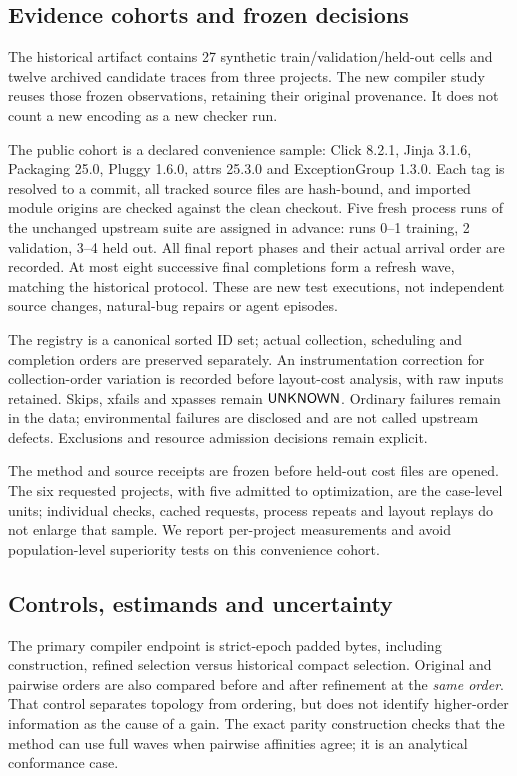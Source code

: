 \documentclass[preprint,12pt]{elsarticle}
\theoremstyle{definition}\newtheorem{definition}[theorem]{Definition}
\begin{document}
\subsection{Evidence cohorts and frozen decisions}
The historical artifact contains 27 synthetic train/validation/held-out
cells and twelve archived candidate traces from three projects.
The new compiler study reuses those frozen observations, retaining their
original provenance. It does not count a new encoding as a new checker run.

The public cohort is a declared convenience sample: Click 8.2.1,
Jinja 3.1.6, Packaging 25.0, Pluggy 1.6.0, attrs 25.3.0 and
ExceptionGroup 1.3.0. Each tag is resolved to a commit, all tracked source
files are hash-bound, and imported module origins are checked against the
clean checkout. Five fresh process runs of the unchanged upstream suite
are assigned in advance: runs 0--1 training, 2 validation, 3--4 held out.
All final report phases and their actual arrival order are recorded.
At most eight successive final completions form a refresh wave, matching
the historical protocol. These are new test executions, not independent
source changes, natural-bug repairs or agent episodes.

The registry is a canonical sorted ID set; actual collection, scheduling and
completion orders are preserved separately. An instrumentation correction
for collection-order variation is recorded before layout-cost analysis,
with raw inputs retained. Skips, xfails and xpasses remain $\mathsf{UNKNOWN}$.
Ordinary failures remain in the data; environmental failures are disclosed
and are not called upstream defects. Exclusions and resource admission
decisions remain explicit.

The method and source receipts are frozen before held-out cost files are
opened. The six requested projects, with five admitted to optimization, are the case-level units; individual checks,
cached requests, process repeats and layout replays do not enlarge that
sample. We report per-project measurements and avoid population-level
superiority tests on this convenience cohort.

\subsection{Controls, estimands and uncertainty}
The primary compiler endpoint is strict-epoch padded bytes, including
construction, refined selection versus historical compact selection.
Original and pairwise orders are also compared before and after refinement
at the \emph{same order}. That control separates topology from ordering,
but does not identify higher-order information as the cause of a gain.
The exact parity construction checks that the method can use full waves
when pairwise affinities agree; it is an analytical conformance case.
\end{document}
